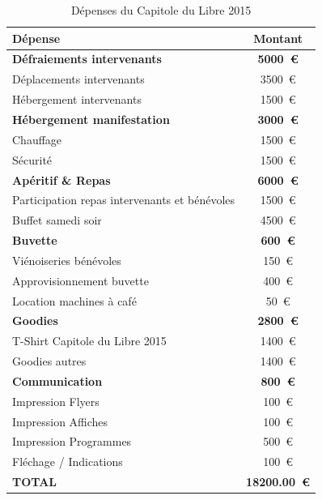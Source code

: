 \begin{table}[!h]
\begin{center}
	\caption{Dépenses du Capitole du Libre 2015}\label{tab_dépenses}
    \begin{tabular}{|l|c|}
        \hline Dépense & Montant \\
        \hline \textbf{Défraiements intervenants} & \textbf{\SI{5000}{€}} \\
        \hline Déplacements intervenants & \SI{3500}{€} \\
        \hline Hébergement intervenants & \SI{1500}{€} \\
        \hline \textbf{Hébergement manifestation} & \textbf{\SI{3000}{€}}\\
        \hline Chauffage & \SI{1500}{€} \\
        \hline Sécurité & \SI{1500}{€} \\
        \hline \textbf{Apéritif \& Repas} & \textbf{\SI{6000}{€}}\\
        \hline Participation repas intervenants et bénévoles & \SI{1500}{€} \\
        \hline Buffet samedi soir & \SI{4500}{€} \\
        \hline \textbf{Buvette} & \textbf{\SI{600}{€}}\\
        \hline Viénoiseries bénévoles & \SI{150}{€} \\
        \hline Approvisionnement buvette & \SI{400}{€} \\
        \hline Location machines à café & \SI{50}{€} \\
        \hline \textbf{Goodies} & \textbf{\SI{2800}{€} }\\
        \hline T-Shirt Capitole du Libre 2015 & \SI{1400}{€} \\
        \hline Goodies autres & \SI{1400}{€} \\
        \hline \textbf{Communication} & \textbf{\SI{800}{€}} \\
        \hline Impression Flyers & \SI{100}{€} \\
        \hline Impression Affiches & \SI{100}{€} \\
        \hline Impression Programmes & \SI{500}{€} \\
        \hline Fléchage / Indications & \SI{100}{€} \\
        \hline
        \hline \textbf{TOTAL} & \textbf{\SI{18200.00}{€}} \\
        \hline
    \end{tabular}
\end{center}
\end{table}

